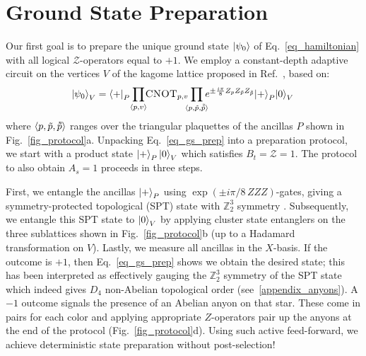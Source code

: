 \documentclass[nofootinbib,pra,twocolumn,showpacs,superscriptaddress,notitlepage,amsmath]{revtex4-2} %
\newcommand{\vardbtilde}[1]{\tilde{\raisebox{0pt}[0.85\height]{$\tilde{#1}$}}}
\begin{document}
\section{Ground State Preparation}
\label{sec_gs_preparation}
Our first goal is to prepare the unique ground state $\ket{\psi_0}$ of Eq.~\eqref{eq_hamiltonian} with all logical $\mathcal{Z}$-operators equal to $+1$. We employ a constant-depth adaptive circuit on the vertices $V$ of the kagome lattice proposed in Ref.~, based on:
\begin{equation}
\! \ket{\psi_0}_V = \bra{+}_P\!  \prod_{\braket{p,v}}\!\! \textsc{CNOT}_{p,v}\!\!\! \prod_{\langle p , \tilde p , \tilde{\tilde p}\rangle} \!\!\!e^{\pm \frac{i \pi}{8}Z_p Z_{\tilde p}Z_{\tilde{\tilde p}}}  \! \ket{+}_{P} \! \ket{0}_V
    \label{eq_gs_prep}
\end{equation}
where $\langle p , \tilde p , \vardbtilde{p} \rangle$ ranges over the triangular plaquettes of the ancillas $P$ shown in Fig.~\ref{fig_protocol}a. Unpacking Eq.~\eqref{eq_gs_prep} into a preparation protocol, we start with a product state $\ket{+}_{P}\ket{0}_V$ which satisfies $B_t =\mathcal Z = 1$. The protocol to also obtain $A_s = 1$ proceeds in three steps.

First, we entangle the ancillas $\ket{+}_P$ using $\exp(\pm i \pi/8 \, ZZZ)$-gates, giving a symmetry-protected topological (SPT) state with $\mathbb Z_2^3$ symmetry \cite{SPTreview,yoshida_topological_2016}. Subsequently, we entangle this SPT state to $\ket{0}_V$ by applying cluster state entanglers \cite{Briegel00} on the three sublattices shown in Fig.~\ref{fig_protocol}b (up to a Hadamard transformation on $V$). Lastly, we measure all ancillas in the $X$-basis. If the outcome is $+1$, then Eq.~\eqref{eq_gs_prep} shows we obtain the desired state; this has been interpreted as effectively gauging the $\mathbb Z_2^3$ symmetry of the SPT state \cite{measureSPT} which indeed gives $D_4$ non-Abelian topological order (see~\ref{appendix_anyons}). A $-1$ outcome signals the presence of an Abelian anyon on that star. These come in pairs for each color and applying appropriate $Z$-operators pair up the anyons at the end of the protocol (Fig.~\ref{fig_protocol}d). Using such active feed-forward, we achieve deterministic state preparation without post-selection!
\end{document}

